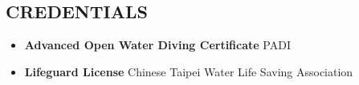 \documentclass[11pt,letterpaper,sans]{moderncv}        %
\begin{document}
\subsection{CREDENTIALS}
\begin{itemize}

\item{\textbf{Advanced Open Water Diving Certificate} PADI}
\item{\textbf{Lifeguard License} Chinese Taipei Water Life Saving Association}

\end{itemize}
\end{document}
